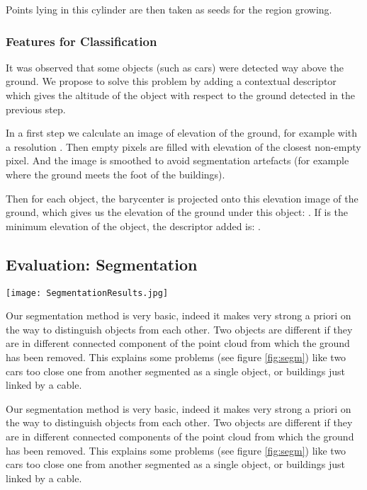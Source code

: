 \documentclass[a4paper, 10pt, journal]{article}
\begin{document}
Points lying in this cylinder are then taken as seeds for the region growing.

\subsubsection{Features for Classification}
It was observed that some objects (such as cars) were detected way above the ground. We propose to solve this problem by adding a contextual descriptor which gives the altitude of the object with respect to the ground detected in the previous step.

In a first step we calculate an image of elevation of the ground, for example with a resolution . Then empty pixels are filled with elevation of the closest non-empty pixel. And the image is smoothed to avoid segmentation artefacts (for example where the ground meets the foot of the buildings).

Then for each object, the barycenter is projected onto this elevation image of the ground, which gives us the elevation of the ground under this object: . If  is the minimum elevation of the object, the descriptor added is: .

\subsection{Evaluation: Segmentation}
\begin{center}\centering
 \texttt{[image: SegmentationResults.jpg]}
\end{center}

Our segmentation method is very basic, indeed it makes very strong a priori on the way to distinguish objects from each other. Two objects are different if they are in different connected component of the point cloud from which the ground has been removed. This explains some problems (see figure \ref{fig:segm}) like two cars too close one from another segmented as a single object, or buildings just linked by a cable.

Our segmentation method is very basic, indeed it makes very strong a priori on the way to distinguish objects from each other. Two objects are different if they are in different connected components of the point cloud from which the ground has been removed. This explains some problems (see figure \ref{fig:segm}) like two cars too close one from another segmented as a single object, or buildings just linked by a cable.
\end{document}
